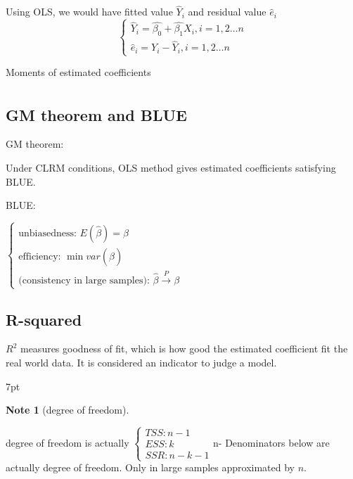 \documentclass{article}
\newenvironment{blueblock}{
\def\FrameCommand{
  \hspace{1pt}
    {\color{DarkBlue}
    \vrule width 2pt}
    {\color{blueshade}
    \vrule width 4pt}
  \colorbox{blueshade}
}
\MakeFramed{
  \advance
  \hsize-
  \width
  \FrameRestore}
\noindent\hspace{-4.55pt}%
\begin{adjustwidth}{}{7pt}
\vspace{2pt}\vspace{2pt}
}
{\vspace{2pt}\end{adjustwidth}\endMakeFramed}
\newtheorem{note}{Note}
\begin{document}
Using OLS, we would have fitted value $\hat Y_i$ and residual value $\hat e_i$
\begin{equation}
  \begin{cases}
    \hat Y_i=\hat{\beta_{0}}+\hat{\beta_{1}}X_i,i=1,2\dots n
    \\
    \hat e_i=Y_i-\hat Y_i,i=1,2\dots n
  \end{cases}
\end{equation}


Moments of estimated coefficients
\begin{align}

\end{align}



\subsection{GM theorem and BLUE} %
\label{sub:gm_theorem_and_blue}

GM theorem:

Under CLRM conditions, OLS method gives estimated coefficients satisfying BLUE.

BLUE:

$\begin{cases}
  \text{unbiasedness: } E(\hat{\beta})=\beta
  \\
  \text{efficiency: } \min var(\hat{\beta})
  \\
  \text{(consistency in large samples): } \hat{\beta} \stackrel{P}{\rightarrow} \beta
\end{cases}$


\subsection{R-squared}

$R^2$ measures goodness of fit, which is how good the estimated coefficient fit the real world data. It is considered an indicator to judge a model.

\begin{blueblock}
\begin{note}[degree of freedom]
\end{note}
degree of freedom is actually $\begin{cases}
 TSS: n-1\\
 ESS: k\\
 SSR: n-k-1
\end{cases}$n-
Denominators below are actually degree of freedom. Only in large samples approximated by $n$.
\end{blueblock}
\end{document}

